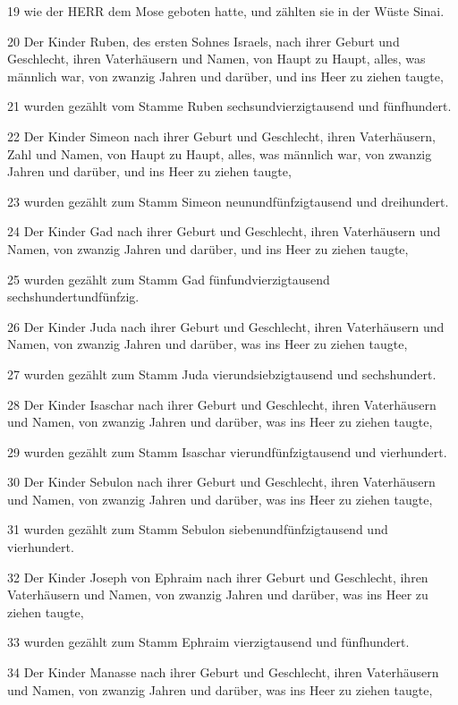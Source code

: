 \par 19 wie der HERR dem Mose geboten hatte, und zählten sie in der Wüste Sinai.
\par 20 Der Kinder Ruben, des ersten Sohnes Israels, nach ihrer Geburt und Geschlecht, ihren Vaterhäusern und Namen, von Haupt zu Haupt, alles, was männlich war, von zwanzig Jahren und darüber, und ins Heer zu ziehen taugte,
\par 21 wurden gezählt vom Stamme Ruben sechsundvierzigtausend und fünfhundert.
\par 22 Der Kinder Simeon nach ihrer Geburt und Geschlecht, ihren Vaterhäusern, Zahl und Namen, von Haupt zu Haupt, alles, was männlich war, von zwanzig Jahren und darüber, und ins Heer zu ziehen taugte,
\par 23 wurden gezählt zum Stamm Simeon neunundfünfzigtausend und dreihundert.
\par 24 Der Kinder Gad nach ihrer Geburt und Geschlecht, ihren Vaterhäusern und Namen, von zwanzig Jahren und darüber, und ins Heer zu ziehen taugte,
\par 25 wurden gezählt zum Stamm Gad fünfundvierzigtausend sechshundertundfünfzig.
\par 26 Der Kinder Juda nach ihrer Geburt und Geschlecht, ihren Vaterhäusern und Namen, von zwanzig Jahren und darüber, was ins Heer zu ziehen taugte,
\par 27 wurden gezählt zum Stamm Juda vierundsiebzigtausend und sechshundert.
\par 28 Der Kinder Isaschar nach ihrer Geburt und Geschlecht, ihren Vaterhäusern und Namen, von zwanzig Jahren und darüber, was ins Heer zu ziehen taugte,
\par 29 wurden gezählt zum Stamm Isaschar vierundfünfzigtausend und vierhundert.
\par 30 Der Kinder Sebulon nach ihrer Geburt und Geschlecht, ihren Vaterhäusern und Namen, von zwanzig Jahren und darüber, was ins Heer zu ziehen taugte,
\par 31 wurden gezählt zum Stamm Sebulon siebenundfünfzigtausend und vierhundert.
\par 32 Der Kinder Joseph von Ephraim nach ihrer Geburt und Geschlecht, ihren Vaterhäusern und Namen, von zwanzig Jahren und darüber, was ins Heer zu ziehen taugte,
\par 33 wurden gezählt zum Stamm Ephraim vierzigtausend und fünfhundert.
\par 34 Der Kinder Manasse nach ihrer Geburt und Geschlecht, ihren Vaterhäusern und Namen, von zwanzig Jahren und darüber, was ins Heer zu ziehen taugte,
